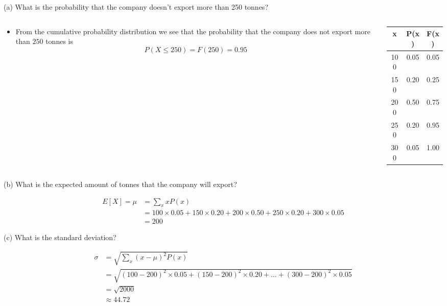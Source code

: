 \documentclass[
  11pt,
  ignorenonframetext,
]{beamer}
\providecommand{\tightlist}{%
  \setlength{\itemsep}{0pt}\setlength{\parskip}{0pt}}
\begin{document}
\begin{frame}{(a) What is the probability that the company doesn't
export more than 250 tonnes?}
\protect\hypertarget{a-what-is-the-probability-that-the-company-doesnt-export-more-than-250-tonnes}{}
\begin{columns}[T]
\begin{column}{.7\textwidth}
\begin{itemize}
\tightlist
\item
  From the cumulative probability distribution we see that the
  probability that the company does not export more than \(250\) tonnes
  is \[
  P(X\leq 250) = F(250) = 0.95
  \]
\end{itemize}
\end{column}

\begin{column}{0.48\textwidth}
\begin{table}
\centering
\begin{tabular}{ccc}
\hline
x & P(x) & F(x) \tabularnewline
\hline
100 & 0.05 & 0.05 \tabularnewline
150 & 0.20 & 0.25\tabularnewline
200 & 0.50 & 0.75\tabularnewline
250 & 0.20 & 0.95\tabularnewline
300 & 0.05 & 1.00\tabularnewline
\hline
\end{tabular}
\end{table}
\end{column}
\end{columns}
\end{frame}

\begin{frame}{(b) What is the expected amount of tonnes that the company
will export?}
\protect\hypertarget{b-what-is-the-expected-amount-of-tonnes-that-the-company-will-export}{}
\small

\[
\begin{aligned}
E[X] = \mu &= \sum_x xP(x)\\
&= 100\times 0.05 + 150 \times 0.20 + 200 \times 0.50 + 250\times 0.20 + 300\times 0.05\\ 
&=200
\end{aligned}
\]
\end{frame}

\begin{frame}{(c) What is the standard deviation?}
\protect\hypertarget{c-what-is-the-standard-deviation}{}
\small

\[
\begin{aligned}
\sigma &= \sqrt{\sum_x (x-\mu)^2 P(x)}\\
&= \sqrt{(100-200)^2 \times 0.05 + (150-200)^2 \times 0.20 + \ldots + (300-200)^2\times 0.05}\\
&= \sqrt{2000}\\
&\approx 44.72
\end{aligned}
\]
\end{frame}
\end{document}
